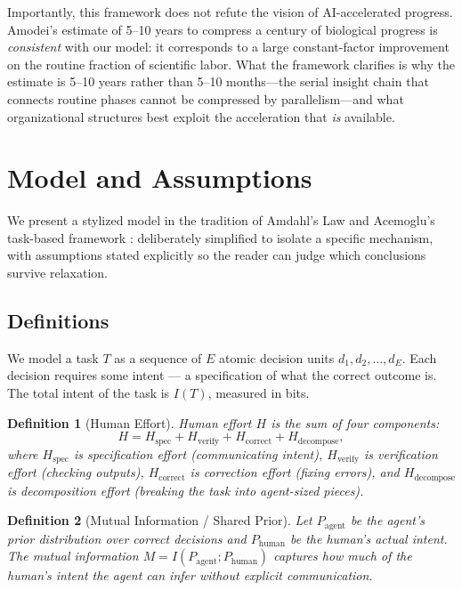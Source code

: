 \documentclass[11pt,a4paper]{article}
\newtheorem{definition}{Definition}
\begin{document}
Importantly, this framework does not refute the vision of AI-accelerated progress. Amodei's estimate of 5--10 years to compress a century of biological progress is \emph{consistent} with our model: it corresponds to a large constant-factor improvement on the routine fraction of scientific labor. What the framework clarifies is why the estimate is 5--10 years rather than 5--10 months---the serial insight chain that connects routine phases cannot be compressed by parallelism---and what organizational structures best exploit the acceleration that \emph{is} available.

\section{Model and Assumptions}
\label{sec:model}

We present a stylized model in the tradition of Amdahl's Law \citep{amdahl1967} and Acemoglu's task-based framework \citep{acemoglu2024}: deliberately simplified to isolate a specific mechanism, with assumptions stated explicitly so the reader can judge which conclusions survive relaxation.

\subsection{Definitions}

We model a task $T$ as a sequence of $E$ atomic decision units $d_1, d_2, \ldots, d_E$. Each decision requires some intent --- a specification of what the correct outcome is. The total intent of the task is $I(T)$, measured in bits.

\begin{definition}[Human Effort]
Human effort $H$ is the sum of four components:
\begin{equation}
H = H_{\text{spec}} + H_{\text{verify}} + H_{\text{correct}} + H_{\text{decompose}},
\end{equation}
where $H_{\text{spec}}$ is specification effort (communicating intent), $H_{\text{verify}}$ is verification effort (checking outputs), $H_{\text{correct}}$ is correction effort (fixing errors), and $H_{\text{decompose}}$ is decomposition effort (breaking the task into agent-sized pieces).
\end{definition}

\begin{definition}[Mutual Information / Shared Prior]
Let $P_{\text{agent}}$ be the agent's prior distribution over correct decisions and $P_{\text{human}}$ be the human's actual intent. The mutual information $M = I(P_{\text{agent}}; P_{\text{human}})$ captures how much of the human's intent the agent can infer without explicit communication.
\end{definition}
\end{document}
